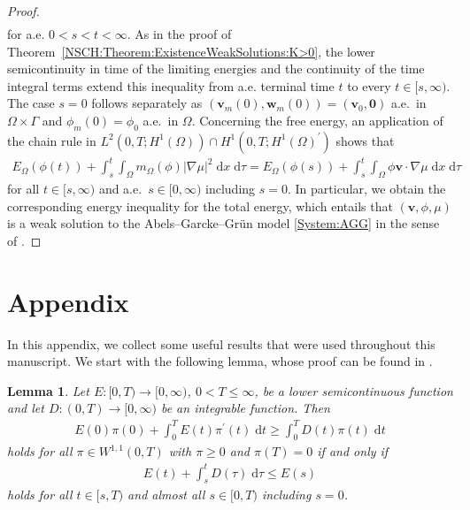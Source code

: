 \documentclass[11pt,reqno]{amsart}
\newtheorem{lemma}[theorem]{Lemma}
\theoremstyle{remark}
\numberwithin{equation}{section}
\newcommand{\abs}[1]{|#1|}
\newcommand{\intO}{\int_\Omega}
\newcommand{\dtau}{\;\mathrm d\tau}
\newcommand{\dt}{\;\mathrm dt}
\newcommand{\dxtau}{\;\mathrm{d}x\;\mathrm{d}\tau}
\newcommand{\Grad}{\nabla}
\newcommand{\Om}{\Omega}
\newcommand{\Ga}{\Gamma}
\newcommand{\bv}{\mathbf v}
\newcommand{\bw}{\mathbf w}
\begin{document}
\begin{proof}
\begin{align*}
\end{align*}
for a.e. $0 < s < t < \infty$. As in the proof of Theorem~\ref{NSCH:Theorem:ExistenceWeakSolutions:K>0}, the lower semicontinuity in time of the limiting energies and the continuity of the time integral terms extend this inequality from a.e. terminal time $t$ to every $t\in[s,\infty)$. The case $s = 0$ follows separately as $(\bv_m(0),\bw_m(0)) = (\bv_0,\mathbf 0)$ a.e.~in $\Om\times\Ga$ and $\phi_m(0) = \phi_0$ a.e.~in $\Om$.
Concerning the free energy, an application of the chain rule in $L^2(0,T;H^1(\Om))\cap H^1(0,T;H^1(\Om)^\prime)$ shows that
\begin{align*}
    E_\Om(\phi(t)) + \int_s^t\intO m_\Om(\phi)\abs{\Grad\mu}^2\dxtau = E_\Om(\phi(s)) + \int_s^t\intO \phi\bv\cdot\Grad\mu\dxtau
\end{align*}
for all $t\in[s,\infty)$ and a.e.~$s\in[0,\infty)$ including $s = 0$. In particular, we obtain the corresponding energy inequality for the total energy, which entails that $(\bv,\phi,\mu)$ is a weak solution to the Abels--Garcke--Grün model \eqref{System:AGG} in the sense of \cite[Definition~3.3]{Abels2013}.
\end{proof}


\section*{Appendix}

\renewcommand\thesection{A}
\setcounter{theorem}{0}
\setcounter{equation}{0}

In this appendix, we collect some useful results that were used throughout this manuscript. We start with the following lemma, whose proof can be found in \cite[Lemma~4.3]{Abels2009}.

\begin{lemma}\label{NSCH:Prelim:Lemma:Energy}
    Let $E:[0,T)\rightarrow[0,\infty)$, $0 < T \leq \infty$, be a lower semicontinuous function and let $D:(0,T)\rightarrow[0,\infty)$ be an integrable function. Then
    \begin{align*}
        E(0)\pi(0) + \int_0^T E(t)\pi^\prime(t)\dt \geq \int_0^T D(t)\pi(t)\dt
    \end{align*}
    holds for all $\pi\in W^{1,1}(0,T)$ with $\pi \geq 0$ and $\pi(T) = 0$ if and only if
    \begin{align*}
        E(t) + \int_s^t D(\tau)\dtau \leq E(s)
    \end{align*}
    holds for all $t\in[s,T)$ and almost all $s\in[0,T)$ including $s = 0$.
\end{lemma}
\end{document}
